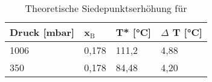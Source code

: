 	\begin{table}[H]
		\caption{Theoretische Siedepunktserhöhung für }
		\label{tab:Siedepunkt_CaCl2}
			\begin{tabular}{|l|l|l|l|}
			\hline
			\textbf{Druck [mbar]}	&	\textbf{x$_\text{B}$}	&	\textbf{T* [°C]} & \textbf{$\Delta$ T [°C]} \\\hline
			1006	&	0,178	&	111,2	&	4,88 \\
			350		&	0,178	&	84,48	&	4,20 \\\hline
			\end{tabular}
	\end{table} 		
